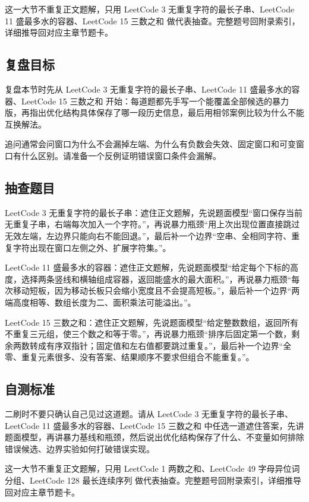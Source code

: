 这一大节不重复正文题解，只用 LeetCode 3 无重复字符的最长子串、LeetCode 11 盛最多水的容器、LeetCode 15 三数之和 做代表抽查。完整题号回附录索引，详细推导回对应主章节题卡。

\subsection{复盘目标}

复盘本节时先从 LeetCode 3 无重复字符的最长子串、LeetCode 11 盛最多水的容器、LeetCode 15 三数之和 开始：每道题都先手写一个能覆盖全部候选的暴力版，再指出优化结构具体保存了哪一段历史信息，最后用相邻案例比较为什么不能互换解法。

追问通常会问窗口为什么不会漏掉左端、为什么有负数会失效、固定窗口和可变窗口有什么区别。请准备一个反例证明错误窗口条件会漏解。

\subsection{抽查题目}

LeetCode 3 无重复字符的最长子串：遮住正文题解，先说题面模型“窗口保存当前无重复子串，右端每次加入一个字符。”，再说暴力瓶颈“用上次出现位置直接跳过无效左端，左边界只能向右不能回退。”，最后补一个边界“空串、全相同字符、重复字符出现在窗口左侧之外、扩展字符集。”。

LeetCode 11 盛最多水的容器：遮住正文题解，先说题面模型“给定每个下标的高度，选择两条竖线和横轴组成容器，返回能盛水的最大面积。”，再说暴力瓶颈“每次移动短板，因为移动长板只会缩小宽度且不会提高短板。”，最后补一个边界“两端高度相等、数组长度为二、面积乘法可能溢出。”。

LeetCode 15 三数之和：遮住正文题解，先说题面模型“给定整数数组，返回所有不重复三元组，使三个数之和等于零。”，再说暴力瓶颈“排序后固定第一个数，剩余两数转成有序双指针；固定值和左右值都要跳过重复。”，最后补一个边界“全零、重复元素很多、没有答案、结果顺序不要求但组合不能重复。”。

\subsection{自测标准}

二刷时不要只确认自己见过这道题。请从 LeetCode 3 无重复字符的最长子串、LeetCode 11 盛最多水的容器、LeetCode 15 三数之和 中任选一道遮住答案，先讲题面模型，再讲暴力基线和瓶颈，然后说出优化结构保存了什么、不变量如何排除错误候选、边界实验如何打破错误实现。

这一大节不重复正文题解，只用 LeetCode 1 两数之和、LeetCode 49 字母异位词分组、LeetCode 128 最长连续序列 做代表抽查。完整题号回附录索引，详细推导回对应主章节题卡。

